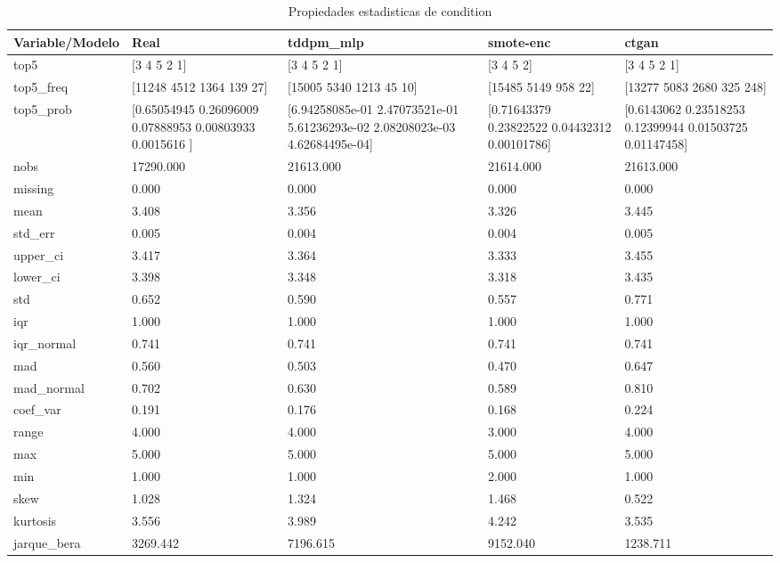 \begin{table}[H]
\centering
\caption{Propiedades  estadisticas de condition}
\label{table-stats-condition}
\begin{tabular}{|l|m{10em}|m{10em}|m{10em}|m{10em}|}
\hline
 \rowcolor[gray]{0.8}
Variable/Modelo & Real & tddpm\_mlp & smote-enc & ctgan \\
\hline top5 & [3 4 5 2 1] & [3 4 5 2 1] & [3 4 5 2] & [3 4 5 2 1] \\
\hline top5\_freq & [11248  4512  1364   139    27] & [15005  5340  1213    45    10] & [15485  5149   958    22] & [13277  5083  2680   325   248] \\
\hline top5\_prob & [0.65054945 0.26096009 0.07888953 0.00803933 0.0015616 ] & [6.94258085e-01 2.47073521e-01 5.61236293e-02 2.08208023e-03
 4.62684495e-04] & [0.71643379 0.23822522 0.04432312 0.00101786] & [0.6143062  0.23518253 0.12399944 0.01503725 0.01147458] \\
\hline nobs & 17290.000 & 21613.000 & 21614.000 & 21613.000 \\
\hline missing & 0.000 & 0.000 & 0.000 & 0.000 \\
\hline mean & 3.408 & 3.356 & 3.326 & 3.445 \\
\hline std\_err & 0.005 & 0.004 & 0.004 & 0.005 \\
\hline upper\_ci & 3.417 & 3.364 & 3.333 & 3.455 \\
\hline lower\_ci & 3.398 & 3.348 & 3.318 & 3.435 \\
\hline std & 0.652 & 0.590 & 0.557 & 0.771 \\
\hline iqr & 1.000 & 1.000 & 1.000 & 1.000 \\
\hline iqr\_normal & 0.741 & 0.741 & 0.741 & 0.741 \\
\hline mad & 0.560 & 0.503 & 0.470 & 0.647 \\
\hline mad\_normal & 0.702 & 0.630 & 0.589 & 0.810 \\
\hline coef\_var & 0.191 & 0.176 & 0.168 & 0.224 \\
\hline range & 4.000 & 4.000 & 3.000 & 4.000 \\
\hline max & 5.000 & 5.000 & 5.000 & 5.000 \\
\hline min & 1.000 & 1.000 & 2.000 & 1.000 \\
\hline skew & 1.028 & 1.324 & 1.468 & 0.522 \\
\hline kurtosis & 3.556 & 3.989 & 4.242 & 3.535 \\
\hline jarque\_bera & 3269.442 & 7196.615 & 9152.040 & 1238.711 \\

\end{tabular}
\end{table}
